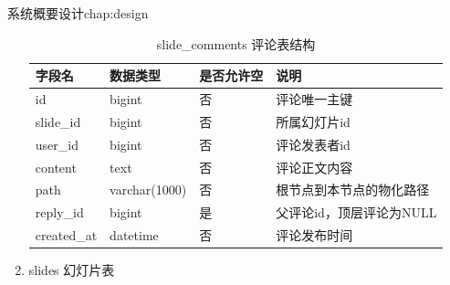 \begin{cuzchapter}{系统概要设计}{chap:design}
\begin{enumerate}
    \begin{table}[htbp]
        \centering
        \caption{slide\_comments 评论表结构}
        \label{tab:slide-comments}
        \begin{tabular}{llll}
            \toprule
            字段名         & 数据类型          & 是否允许空 & 说明              \\
            \midrule
            id          & bigint        & 否     & 评论唯一主键          \\
            slide\_id   & bigint        & 否     & 所属幻灯片id         \\
            user\_id    & bigint        & 否     & 评论发表者id         \\
            content     & text          & 否     & 评论正文内容          \\
            path        & varchar(1000) & 否     & 根节点到本节点的物化路径    \\
            reply\_id   & bigint        & 是     & 父评论id，顶层评论为NULL \\
            created\_at & datetime      & 否     & 评论发布时间          \\
            \bottomrule
        \end{tabular}
    \end{table}
    \item slides 幻灯片表


\end{enumerate}
\end{cuzchapter}
